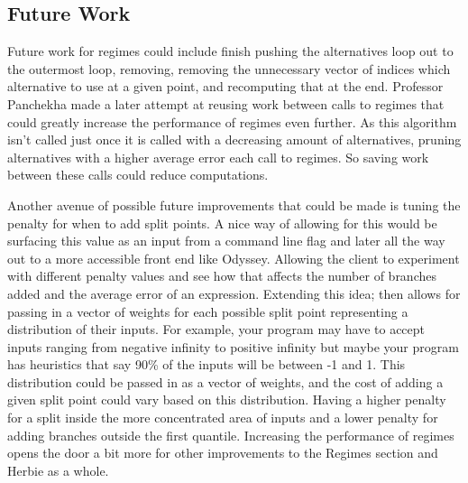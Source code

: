 \documentclass{article}
\begin{document}
\subsection{Future Work}

Future work for regimes could include finish pushing the alternatives loop out to the outermost loop, removing, removing the unnecessary vector of indices which alternative to use at a given point, and recomputing that at the end. Professor Panchekha made a later attempt at reusing work between calls to regimes that could greatly increase the performance of regimes even further. As this algorithm isn't called just once it is called with a decreasing amount of alternatives, pruning alternatives with a higher average error each call to regimes. So saving work between these calls could reduce computations.

Another avenue of possible future improvements that could be made is tuning the penalty for when to add split points. A nice way of allowing for this would be surfacing this value as an input from a command line flag and later all the way out to a more accessible front end like Odyssey. Allowing the client to experiment with different penalty values and see how that affects the number of branches added and the average error of an expression. Extending this idea; then allows for passing in a vector of weights for each possible split point representing a distribution of their inputs. For example, your program may have to accept inputs ranging from negative infinity to positive infinity but maybe your program has heuristics that say 90\% of the inputs will be between -1 and 1. This distribution could be passed in as a vector of weights, and the cost of adding a given split point could vary based on this distribution. Having a higher penalty for a split inside the more concentrated area of inputs and a lower penalty for adding branches outside the first quantile. Increasing the performance of regimes opens the door a bit more for other improvements to the Regimes section and Herbie as a whole.



\newpage
\appendix
\lstset{style=racket-source-code}
\end{document}
